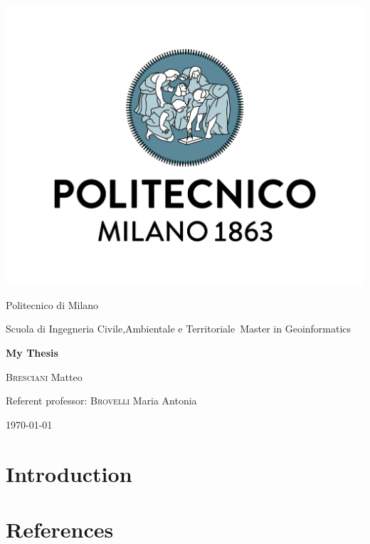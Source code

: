 \documentclass[fontsize=11pt,paper=a4,pagesize=auto]{report}
\begin{document}
\begin{titlepage}
	\centering
	\includegraphics[scale = 0.20]{images/polimi.jpg}\par
	{\Large
		Politecnico di Milano\par
		Scuola di Ingegneria Civile,Ambientale e Territoriale\
		Master in Geoinformatics\par}
			\vspace{0.5cm}
	{\huge\bfseries
		My Thesis\\\par}
	\vspace{1cm}
	{\Large
		{\scshape Bresciani} Matteo\par}
	\vfill
	Referent professor: {\scshape Brovelli} Maria Antonia\par
	\vfill
	{\large\today\par}
\end{titlepage}



\tableofcontents

\chapter{Introduction}




\chapter{References}

\end{document}
